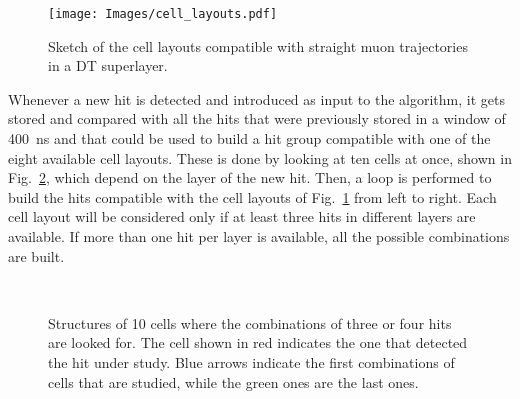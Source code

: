 \documentclass[../main.tex]{subfiles}
\begin{document}
\begin{figure}[h!]
\begin{center}
\texttt{[image: Images/cell\_layouts.pdf]}
\end{center}
\caption[Cell layouts inside a DT superlayer]{Sketch of the cell layouts compatible with straight muon trajectories in a DT superlayer.}
\label{dts:fig:cell_layouts}
\end{figure}

Whenever a new hit is detected and introduced as input to the algorithm, it gets stored and compared with all the hits that were previously stored in a window of 400~ns and that could be used to build a hit group compatible with one of the eight available cell layouts. These is done by looking at ten cells at once, shown in Fig.~\ref{dts:fig:triangle}, which depend on the layer of the new hit. Then, a loop is performed to build the hits compatible with the cell layouts of Fig.~\ref{dts:fig:cell_layouts} from left to right. Each cell layout will be considered only if at least three hits in different layers are available. If more than one hit per layer is available, all the possible combinations are built.



\begin{figure}[h!]
\begin{center}
\\
\end{center}
\caption[DT trapezoid]{Structures of 10 cells where the combinations of three or four hits are looked for. The cell shown in red indicates the one that detected the hit under study. Blue arrows indicate the first combinations of cells that are studied, while the green ones are the last ones.}
\label{dts:fig:triangle}
\end{figure}
\end{document}
